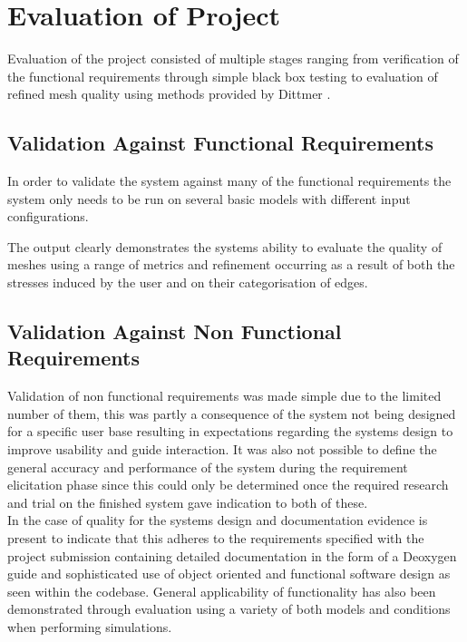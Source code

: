 
\section{Evaluation of Project}
Evaluation of the project consisted of multiple stages ranging from verification of the functional requirements through simple black box testing to evaluation of refined mesh quality using methods provided by Dittmer \cite{DittmerMeshQualityMet}. 

\subsection{Validation Against Functional Requirements}
In order to validate the system against many of the functional requirements the system only needs to be run on several basic models with different input configurations. 

The output clearly demonstrates the systems ability to evaluate the quality of meshes using a range of metrics and refinement occurring as a result of both the stresses induced by the user and on their categorisation of edges. 


\subsection{Validation Against Non Functional Requirements}
Validation of non functional requirements was made simple due to the limited number of them, this was partly a consequence of the system not being designed for a specific user base resulting in expectations regarding the systems design to improve usability and guide interaction. It was also not possible to define the general accuracy and performance of the system during the requirement elicitation phase since this could only be determined once the required research and trial on the finished system gave indication to both of these. \\

\noindent
In the case of quality for the systems design and documentation evidence is present to indicate that this adheres to the requirements specified with the project submission containing detailed documentation in the form of a Deoxygen guide and sophisticated use of object oriented and functional software design as seen within the codebase. General applicability of functionality has also been demonstrated through evaluation using a variety of both models and conditions when performing simulations.

